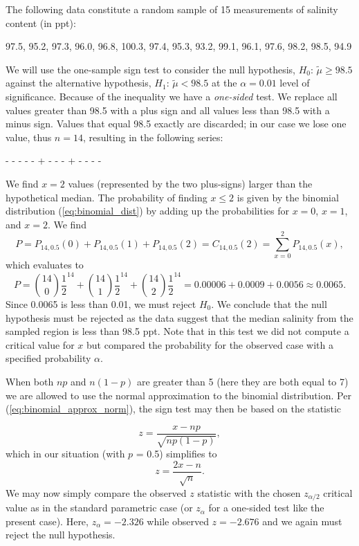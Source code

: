 \begin{example}
The following data constitute a random sample of 15 measurements of salinity
content (in ppt):
\begin{center}
	97.5, 95.2, 97.3, 96.0, 96.8, 100.3, 97.4, 95.3, 93.2, 99.1, 96.1, 97.6, 98.2, 98.5, 94.9
\end{center}
We will use the one-sample sign test to consider the null hypothesis, $H_0$: $\tilde{\mu} \geq 98.5$ against the
alternative hypothesis, $H_1$: $\tilde{\mu} < 98.5$ at the $\alpha = 0.01$ level of significance.  Because of the inequality
we have a \emph{one-sided} test.  We replace all values greater than 98.5 with a plus sign and all values less
than 98.5 with a minus sign.  Values that equal 98.5 exactly are discarded; in our case we lose one value,
thus $n = 14$, resulting in the following series:
\begin{center}
	- - - - - + - - - + - - - -
\end{center}
We find $x = 2$ values (represented by the two plus-signs) larger than the hypothetical median.  The probability of finding $x \le 2$ is given by
the binomial distribution (\ref{eq:binomial_dist}) by adding up the probabilities for $x = 0$, $x = 1$, and
$x = 2$.  We find
\begin{equation}
P = P_{14,0.5}(0) + P_{14,0.5}(1) + P_{14,0.5}(2) = C_{14,0.5}(2) = \sum_{x=0}^{2} P_{14,0.5}(x),
\end{equation}
which evaluates to
\begin{equation}
P = \binom{14}{0} \frac{1}{2}^{14} + \binom{14}{1} \frac{1}{2}^{14} + \binom{14}{2} \frac{1}{2}^{14} = 0.00006 + 0.0009 + 0.0056 \approx 0.0065.
\end{equation}
Since 0.0065 is less than 0.01, we must reject $H_0$. We conclude that the null hypothesis must be rejected as the
data suggest that the median salinity from the sampled
region is less than 98.5 ppt.  Note that in this test we did not compute a critical value for $x$ but compared
the probability for the observed case with a specified probability $\alpha$.
\end{example}

When both $np$ and $n(1 - p)$ are greater than 5 (here they are both equal to 7) we are allowed to use the normal approximation to
the binomial distribution.  Per (\ref{eq:binomial_approx_norm}), the sign test may then be based on the statistic

\begin{equation}
z = \frac{x - np}{\sqrt{np(1-p)}},
\end{equation}
which in our situation (with $p$ = 0.5) simplifies to
\begin{equation}
z = \frac{2x - n}{\sqrt{n}}.
\end{equation}
We may now simply compare the observed $z$ statistic with the chosen $z_{\alpha/2}$
critical value as in the standard parametric case (or $z_{\alpha}$ for a one-sided test like the present case).  Here,
$z_{\alpha} = -2.326$ while observed $z = -2.676$ and we again must reject the null hypothesis.

